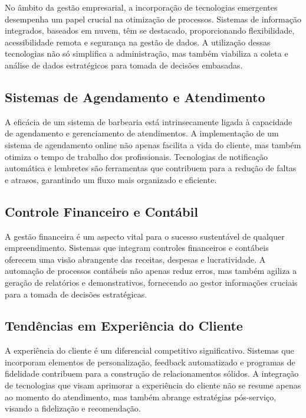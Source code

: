 \documentclass[12pt]{article}
\begin{document}
No âmbito da gestão empresarial, a incorporação de tecnologias emergentes desempenha um papel crucial na otimização de processos. Sistemas de informação integrados, baseados em nuvem, têm se destacado, proporcionando flexibilidade, acessibilidade remota e segurança na gestão de dados. A utilização dessas tecnologias não só simplifica a administração, mas também viabiliza a coleta e análise de dados estratégicos para tomada de decisões embasadas.

\subsection{Sistemas de Agendamento e Atendimento}

A eficácia de um sistema de barbearia está intrinsecamente ligada à capacidade de agendamento e gerenciamento de atendimentos. A implementação de um sistema de agendamento online não apenas facilita a vida do cliente, mas também otimiza o tempo de trabalho dos profissionais. Tecnologias de notificação automática e lembretes são ferramentas que contribuem para a redução de faltas e atrasos, garantindo um fluxo mais organizado e eficiente.

\subsection{Controle Financeiro e Contábil}

A gestão financeira é um aspecto vital para o sucesso sustentável de qualquer empreendimento. Sistemas que integram controles financeiros e contábeis oferecem uma visão abrangente das receitas, despesas e lucratividade. A automação de processos contábeis não apenas reduz erros, mas também agiliza a geração de relatórios e demonstrativos, fornecendo ao gestor informações cruciais para a tomada de decisões estratégicas.

\subsection{Tendências em Experiência do Cliente}

A experiência do cliente é um diferencial competitivo significativo. Sistemas que incorporam elementos de personalização, feedback automatizado e programas de fidelidade contribuem para a construção de relacionamentos sólidos. A integração de tecnologias que visam aprimorar a experiência do cliente não se resume apenas ao momento do atendimento, mas também abrange estratégias pós-serviço, visando a fidelização e recomendação.
\end{document}
